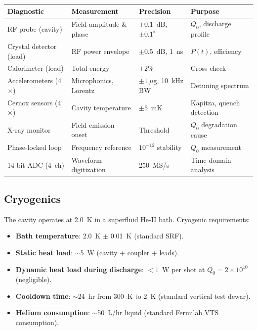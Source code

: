 \documentclass[11pt]{article}
\newcommand{\ee}[1]{\times 10^{#1}}
\newcommand{\Qzero}{Q_0}
\begin{document}
\begin{center}
\begin{tabular}{llll}
\toprule
Diagnostic & Measurement & Precision & Purpose \\
\midrule
RF probe (cavity) & Field amplitude \& phase & $\pm 0.1$~dB, $\pm 0.1^\circ$ & $\Qzero$, discharge profile \\
Crystal detector (load) & RF power envelope & $\pm 0.5$~dB, 1~ns & $P(t)$, efficiency \\
Calorimeter (load) & Total energy & $\pm 2\%$ & Cross-check \\
Accelerometers (4$\times$) & Microphonics, Lorentz & $\pm 1~\mu$g, 10~kHz BW & Detuning spectrum \\
Cernox sensors (4$\times$) & Cavity temperature & $\pm 5$~mK & Kapitza, quench detection \\
X-ray monitor & Field emission onset & Threshold & $\Qzero$ degradation cause \\
Phase-locked loop & Frequency reference & $10^{-12}$ stability & $\Qzero$ measurement \\
14-bit ADC (4~ch) & Waveform digitization & 250~MS/s & Time-domain analysis \\
\bottomrule
\end{tabular}
\end{center}

\subsection{Cryogenics}

The cavity operates at 2.0~K in a superfluid He-II bath. Cryogenic
requirements:

\begin{itemize}[nosep]
  \item \textbf{Bath temperature}: 2.0~K $\pm$ 0.01~K (standard SRF).
  \item \textbf{Static heat load}: $\sim$5~W (cavity + coupler + leads).
  \item \textbf{Dynamic heat load during discharge}: $< 1$~W per shot
    at $\Qzero = 2\ee{10}$ (negligible).
  \item \textbf{Cooldown time}: $\sim$24~hr from 300~K to 2~K
    (standard vertical test dewar).
  \item \textbf{Helium consumption}: $\sim$50~L/hr liquid (standard
    Fermilab VTS consumption).
\end{itemize}

\end{document}

